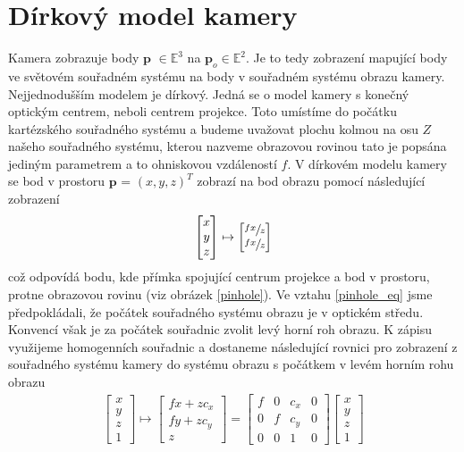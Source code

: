 \documentclass[twoside]{ctuthesis}
\newcommand{\tl}[1]{$\mathbf{#1}$}
\begin{document}
\section{Dírkový model kamery}
Kamera zobrazuje body \tl{p} $\in \mathbb{E}^3$ na $\mathbf{p}_{o} \in \mathbb{E}^2$. Je to tedy zobrazení mapující body ve světovém souřadném systému na body v souřadném systému obrazu kamery. Nejjednodušším modelem je dírkový. Jedná se o model kamery s konečný optickým centrem, neboli centrem projekce. Toto umístíme do počátku kartézského souřadného systému a budeme uvažovat plochu kolmou na osu $Z$ našeho souřadného systému, kterou nazveme obrazovou rovinou tato je popsána jediným parametrem a to ohniskovou vzdáleností $f$. V dírkovém modelu kamery se bod v prostoru \tl{p} = $(x,y,z)^T$ zobrazí na bod obrazu pomocí následující zobrazení
\begin{align}
    \begin{bmatrix} x \\ y \\ z \end{bmatrix} \mapsto \begin{bmatrix} \sfrac{fx}{z} \\ \sfrac{fx}{z} \end{bmatrix}
    \label{pinhole_eq}
\end{align}
což odpovídá bodu, kde přímka spojující centrum projekce a bod v prostoru, protne obrazovou rovinu (viz obrázek \ref{pinhole}). Ve vztahu \ref{pinhole_eq} jsme předpokládali, že počátek souřadného systému obrazu je v optickém středu. Konvencí však je za počátek souřadnic zvolit levý horní roh obrazu. K zápisu využijeme homogenních souřadnic a dostaneme následující rovnici pro zobrazení z souřadného systému kamery do systému obrazu s počátkem v levém horním rohu obrazu
\begin{align}
    \begin{bmatrix} x \\ y \\ z \\ 1 \end{bmatrix} \mapsto \begin{bmatrix} fx + zc_x \\ fy + zc_y \\ z \end{bmatrix} = \begin{bmatrix} f & 0 & c_x & 0 \\ 0 & f & c_y & 0 \\ 0 & 0 & 1 &0 \end{bmatrix} \begin{bmatrix} x \\ y \\ z \\ 1 \end{bmatrix}
    \label{eq:pinhole_homogenous}
\end{align}
\end{document}
